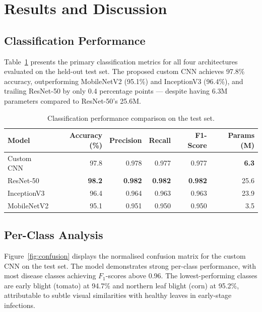 \section{Results and Discussion}

\subsection{Classification Performance}

Table~\ref{tab:results} presents the primary classification metrics for all
four architectures evaluated on the held-out test set. The proposed custom
CNN achieves 97.8\% accuracy, outperforming MobileNetV2 (95.1\%) and
InceptionV3 (96.4\%), and trailing ResNet-50 by only 0.4 percentage points
— despite having 6.3M parameters compared to ResNet-50's 25.6M.

\begin{table}[H]
  \centering
  \caption{Classification performance comparison on the test set.}
  \label{tab:results}
  \begin{tabular}{@{}lrrrrr@{}}
    \toprule
    \textbf{Model}
      & \textbf{Accuracy (\%)}
      & \textbf{Precision}
      & \textbf{Recall}
      & \textbf{F1-Score}
      & \textbf{Params (M)} \\
    \midrule
    Custom CNN   & 97.8 & 0.978 & 0.977 & 0.977 &  \textbf{6.3} \\
    ResNet-50    & \textbf{98.2} & \textbf{0.982} & \textbf{0.982} & \textbf{0.982} & 25.6 \\
    InceptionV3  & 96.4 & 0.964 & 0.963 & 0.963 & 23.9 \\
    MobileNetV2  & 95.1 & 0.951 & 0.950 & 0.950 &  3.5 \\
    \bottomrule
  \end{tabular}
\end{table}

\subsection{Per-Class Analysis}

Figure~\ref{fig:confusion} displays the normalised confusion matrix for the
custom CNN on the test set. The model demonstrates strong per-class
performance, with most disease classes achieving $F_1$-scores above 0.96.
The lowest-performing classes are early blight (tomato) at 94.7\% and
northern leaf blight (corn) at 95.2\%, attributable to subtle visual
similarities with healthy leaves in early-stage infections.

